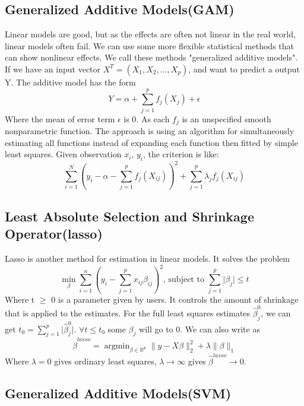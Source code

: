 \documentclass[11pt]{article}
\DeclareMathOperator*{\argminB}{argmin}   %
\begin{document}
\subsection{Generalized Additive Models(GAM)}  
Linear models are good, but as the effects are often not linear in the real world, linear models often fail. We can use some more flexible statistical methods that can show nonlinear effects. We call these methods "generalized additive models". If we have an input vector $X^T=(X_1,X_2,...,X_p)$, and want to predict a output Y. The additive model has the form $$Y=\alpha+\sum_{j=1}^{p} f_j(X_j)+\epsilon$$
Where the mean of error term $\epsilon$ is 0. As each $f_j$ is an unspecified smooth nonparametric function. The approach is using an algorithm for simultaneously estimating all functions instead of expanding each function then fitted by simple least squares. Given observation $x_i$, $y_i$, the criterion is like: $$\sum_{i=1}^{N} (y_i-\alpha-\sum_{j=1}^{p}f_j(X_{ij}))^2+\sum_{j=1}^{p} \lambda_jf_j(X_{ij})$$

\subsection{Least Absolute Selection and Shrinkage Operator(lasso)}  
Lasso is another method for estimation in linear models. It solves the problem $$\min_{\beta} \sum_{i=1}^{n} (y_i-\sum_{j=1}^{p} x_{ij}\beta_{ij})^2 \text{, subject to } \sum_{j=1}^{p} \lvert \beta_j \rvert \leq t$$
Where t $\geq$ 0 is a parameter given by users. It controls the amount of shrinkage that is applied to the estimates. For the full least squares estimates $\hat{\beta}^0_j$, we can get $t_0=\sum_{j=1}^{p} \lvert \hat{\beta}^0_j \rvert$. $\forall t \leq t_0$ some $\beta_j$ will go to 0. We can also write as $$\hat\beta^{lasso}=\argminB_{\beta \in \mathbb{R}^p} \lVert y-X\beta\rVert^2_2+\lambda\lVert \beta \rVert_1$$
Where $\lambda=0$ gives ordinary least squares, $\lambda\to\infty$ gives $\hat\beta^{lasso}\to0$. 

\subsection{Generalized Additive Models(SVM)}  
\end{document}
